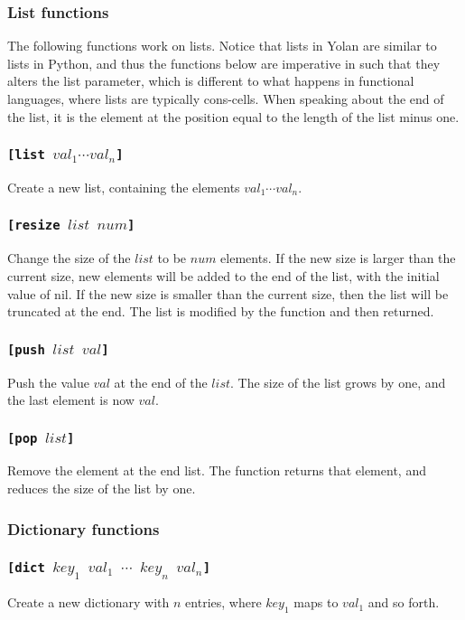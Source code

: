 \documentclass[11pt]{report}
\begin{document}
\subsubsection{List functions}
The following functions work on lists. Notice that lists in Yolan are similar to lists in Python, and thus the functions below are imperative in such that they alters the list parameter, which is different to what happens in functional languages, where lists are typically cons-cells. When speaking about the end of the list, it is the element at the position equal to the length of the list minus one.

\subsubsection*{\tt{[list }$val_1\cdots val_n$\tt{]}}
Create a new list, containing the elements $val_1\cdots val_n$.

\subsubsection*{\tt{[resize }$list$ $num$\tt{]}}
Change the size of the $list$ to be $num$ elements. 
If the new size is larger than the current size, new elements will be added to the end of the list, with the initial value of nil. If the new size is smaller than the current size, then the list will be truncated at the end. The list is modified by the function and then returned.

\subsubsection*{\tt{[push }$list$ $val$\tt{]}}
Push the value $val$ at the end of the $list$. The size of the list grows by one, and the last element is now $val$.

\subsubsection*{\tt{[pop }$list$\tt{]}}
Remove the element at the end list. The function returns that element, and reduces the size of the list by one.

\subsubsection{Dictionary functions}
\subsubsection*{\tt{[dict }$key_1$  $val_1$ $\cdots$ $key_n$ $val_n$\tt{]}}
Create a new dictionary with $n$ entries, where $key_1$ maps to $val_1$ and so forth.
\end{document}

